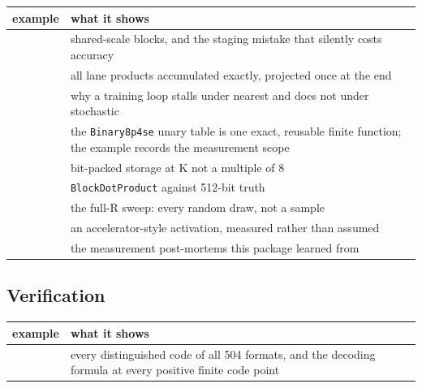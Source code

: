 \begin{table}[h]
\centering
\begin{tabulary}{\linewidth}{L L}
\toprule
example & what it shows \\
\toprule
{} & shared-scale blocks, and the staging mistake that silently costs accuracy \\
 & all lane products accumulated exactly, projected once at the end \\
 & why a training loop stalls under nearest and does not under stochastic \\
 & the \texttt{Binary8p4se} unary table is one exact, reusable finite function; the example records the measurement scope \\
 & bit-packed storage at K not a multiple of 8 \\
 & \texttt{BlockDotProduct} against 512-bit truth \\
 & the full-R sweep: every random draw, not a sample \\
 & an accelerator-style activation, measured rather than assumed \\
 & the measurement post-mortems this package learned from \\
\bottomrule
\end{tabulary}

\end{table}



\subsection{Verification}



\label{3495151348087866384}{}



\begin{table}[h]
\centering
\begin{tabulary}{\linewidth}{L L}
\toprule
example & what it shows \\
\toprule
{} & every distinguished code of all 504 formats, and the decoding formula at every positive finite code point \\
\bottomrule
\end{tabulary}

\end{table}



